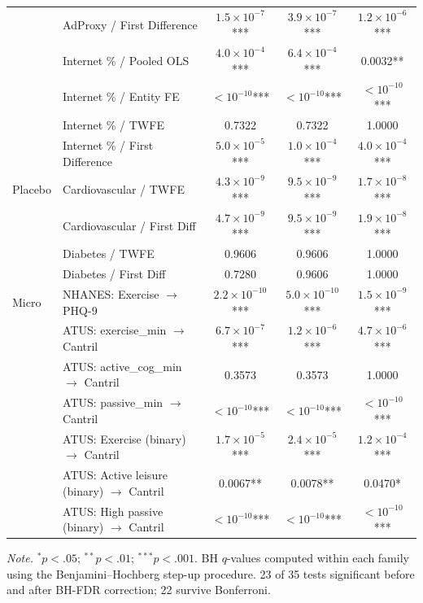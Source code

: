 \documentclass[a4paper,11pt,titlepage]{article}
\begin{document}
\begin{table}[htbp]
\begin{tabular}{llccc}
   & AdProxy / First Difference & $1.5 \times 10^{-7}$*** & $3.9 \times 10^{-7}$*** & $1.2 \times 10^{-6}$*** \\
   & Internet \% / Pooled OLS & $4.0 \times 10^{-4}$*** & $6.4 \times 10^{-4}$*** & 0.0032** \\
   & Internet \% / Entity FE & $< 10^{-10}$*** & $< 10^{-10}$*** & $< 10^{-10}$*** \\
   & Internet \% / TWFE & 0.7322 & 0.7322 & 1.0000 \\
   & Internet \% / First Difference & $5.0 \times 10^{-5}$*** & $1.0 \times 10^{-4}$*** & $4.0 \times 10^{-4}$*** \\
\addlinespace
  Placebo & Cardiovascular / TWFE & $4.3 \times 10^{-9}$*** & $9.5 \times 10^{-9}$*** & $1.7 \times 10^{-8}$*** \\
   & Cardiovascular / First Diff & $4.7 \times 10^{-9}$*** & $9.5 \times 10^{-9}$*** & $1.9 \times 10^{-8}$*** \\
   & Diabetes / TWFE & 0.9606 & 0.9606 & 1.0000 \\
   & Diabetes / First Diff & 0.7280 & 0.9606 & 1.0000 \\
\addlinespace
  Micro & NHANES: Exercise $\to$ PHQ-9 & $2.2 \times 10^{-10}$*** & $5.0 \times 10^{-10}$*** & $1.5 \times 10^{-9}$*** \\
   & ATUS: exercise\_min $\to$ Cantril & $6.7 \times 10^{-7}$*** & $1.2 \times 10^{-6}$*** & $4.7 \times 10^{-6}$*** \\
   & ATUS: active\_cog\_min $\to$ Cantril & 0.3573 & 0.3573 & 1.0000 \\
   & ATUS: passive\_min $\to$ Cantril & $< 10^{-10}$*** & $< 10^{-10}$*** & $< 10^{-10}$*** \\
   & ATUS: Exercise (binary) $\to$ Cantril & $1.7 \times 10^{-5}$*** & $2.4 \times 10^{-5}$*** & $1.2 \times 10^{-4}$*** \\
   & ATUS: Active leisure (binary) $\to$ Cantril & 0.0067** & 0.0078** & 0.0470* \\
   & ATUS: High passive (binary) $\to$ Cantril & $< 10^{-10}$*** & $< 10^{-10}$*** & $< 10^{-10}$*** \\
\bottomrule
\end{tabular}
\par\smallskip\noindent\textit{Note.} $^{*}p<.05$; $^{**}p<.01$; $^{***}p<.001$. BH $q$-values computed within each family using the Benjamini--Hochberg step-up procedure. 23 of 35 tests significant before and after BH-FDR correction; 22 survive Bonferroni.
\end{table}
\end{document}
